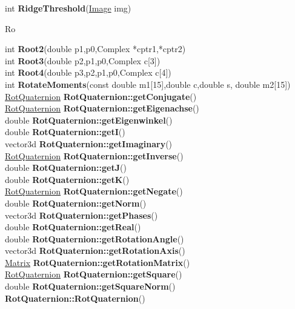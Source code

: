 \documentclass[10pt,titlepage]{article}
\def\functionlistentry#1#2#3#4#5#6{\noindent #1 {\bf #2}(#3) \dotfill #6\\}
\def\letterref#1{}
\def\letterlabel#1{\vspace{0.5cm}\centerline{\Large #1}}
\def\letterlabelend#1{}
\begin{document}
{{\letterref{Ra}
\letterref{Re}
\letterref{Rg}
\letterref{Ri}
\letterref{Ro}
\letterlabelend{Ri}
\functionlistentry{int}{RidgeThreshold}{\hyperlink{Image}{Image} img}{450}{conturs}{}

\letterlabel{Ro}
\letterref{A}
\letterref{B}
\letterref{C}
\letterref{D}
\letterref{E}
\letterref{F}
\letterref{G}
\letterref{H}
\letterref{I}
\letterref{K}
\letterref{L}
\letterref{M}
\letterref{N}
\letterref{O}
\letterref{P}
\letterref{Q}
\letterref{R}
\letterref{S}
\letterref{T}
\letterref{U}
\letterref{V}
\letterref{W}
\letterref{X}
\letterref{Y}
\letterref{Z}

\letterref{Ra}
\letterref{Re}
\letterref{Rg}
\letterref{Ri}
\letterref{Ro}
\letterlabelend{Ro}
\functionlistentry{int}{Root2}{double p1,p0,Complex *cptr1,*cptr2}{1396}{numeric}{}
\functionlistentry{int}{Root3}{double p2,p1,p0,Complex c[3]}{1397}{numeric}{}
\functionlistentry{int}{Root4}{double p3,p2,p1,p0,Complex c[4]}{1398}{numeric}{}
\functionlistentry{int}{RotateMoments}{const double m1[15],double c,double s, double m2[15]}{1612}{obsolet}{}
\functionlistentry{\hyperlink{RotQuaternion}{RotQuaternion}}{RotQuaternion::getConjugate}{}{1492}{quaternions}{}
\functionlistentry{\hyperlink{RotQuaternion}{RotQuaternion}}{RotQuaternion::getEigenachse}{}{1498}{quaternions}{}
\functionlistentry{double}{RotQuaternion::getEigenwinkel}{}{1497}{quaternions}{}
\functionlistentry{double}{RotQuaternion::getI}{}{1483}{quaternions}{}
\functionlistentry{vector3d}{RotQuaternion::getImaginary}{}{1486}{quaternions}{}
\functionlistentry{\hyperlink{RotQuaternion}{RotQuaternion}}{RotQuaternion::getInverse}{}{1493}{quaternions}{}
\functionlistentry{double}{RotQuaternion::getJ}{}{1484}{quaternions}{}
\functionlistentry{double}{RotQuaternion::getK}{}{1485}{quaternions}{}
\functionlistentry{\hyperlink{RotQuaternion}{RotQuaternion}}{RotQuaternion::getNegate}{}{1491}{quaternions}{}
\functionlistentry{double}{RotQuaternion::getNorm}{}{1495}{quaternions}{}
\functionlistentry{vector3d}{RotQuaternion::getPhases}{}{1499}{quaternions}{}
\functionlistentry{double}{RotQuaternion::getReal}{}{1482}{quaternions}{}
\functionlistentry{double}{RotQuaternion::getRotationAngle}{}{1487}{quaternions}{}
\functionlistentry{vector3d}{RotQuaternion::getRotationAxis}{}{1488}{quaternions}{}
\functionlistentry{\hyperlink{Matrix}{Matrix}}{RotQuaternion::getRotationMatrix}{}{1500}{quaternions}{}
\functionlistentry{\hyperlink{RotQuaternion}{RotQuaternion}}{RotQuaternion::getSquare}{}{1494}{quaternions}{}
\functionlistentry{double}{RotQuaternion::getSquareNorm}{}{1496}{quaternions}{}
\functionlistentry{}{RotQuaternion::RotQuaternion}{}{1478}{quaternions}{}
}}
\end{document}
